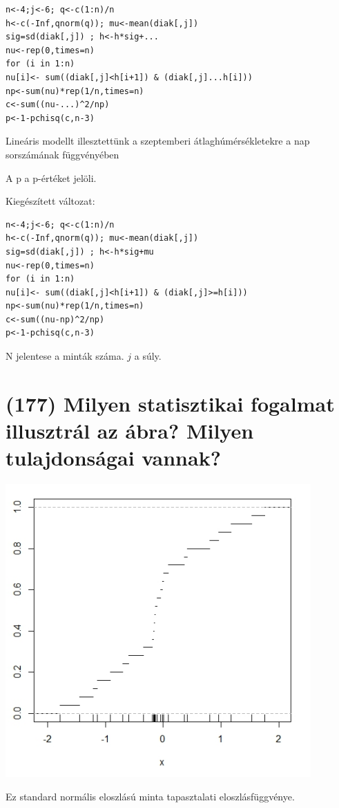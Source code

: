 \documentclass[12p]{article}
\begin{document}
\begin{verbatim}
n<-4;j<-6; q<-c(1:n)/n
h<-c(-Inf,qnorm(q)); mu<-mean(diak[,j])
sig=sd(diak[,j]) ; h<-h*sig+...
nu<-rep(0,times=n)
for (i in 1:n)
nu[i]<- sum((diak[,j]<h[i+1]) & (diak[,j]...h[i]))
np<-sum(nu)*rep(1/n,times=n)
c<-sum((nu-...)^2/np)
p<-1-pchisq(c,n-3)
\end{verbatim}

Lineáris modellt illesztettünk a
szeptemberi átlaghúmérsékletekre a nap sorszámának függvényében

A p a p-értéket jelöli.

Kiegészített változat:

\begin{verbatim}
n<-4;j<-6; q<-c(1:n)/n
h<-c(-Inf,qnorm(q)); mu<-mean(diak[,j])
sig=sd(diak[,j]) ; h<-h*sig+mu
nu<-rep(0,times=n)
for (i in 1:n)
nu[i]<- sum((diak[,j]<h[i+1]) & (diak[,j]>=h[i]))
np<-sum(nu)*rep(1/n,times=n)
c<-sum((nu-np)^2/np)
p<-1-pchisq(c,n-3)
\end{verbatim}

N jelentese a minták száma. $j$ a súly.


\section{(177) Milyen statisztikai fogalmat illusztrál az ábra? Milyen tulajdonságai vannak?}

\includegraphics[scale=1.0]{gorbe2}

Ez standard normális eloszlású minta tapasztalati eloszlásfüggvénye.
\end{document}
